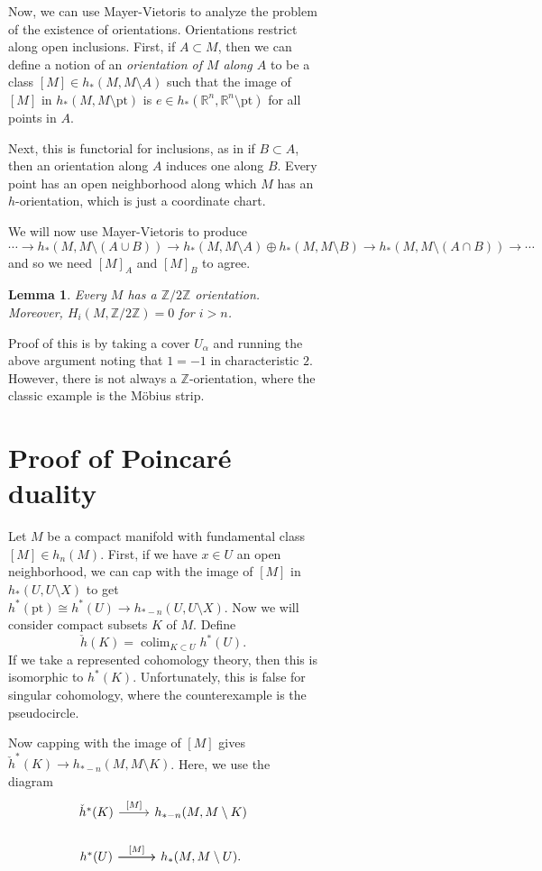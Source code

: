 \documentclass[leqno, openany]{memoir}
\newtheorem{lem}[thm]{Lemma}
\theoremstyle{definition}
\theoremstyle{remark}
\theoremstyle{plain}
\theoremstyle{definition}
\theoremstyle{remark}
\newcommand{\R}{\mathbb{R}}
\newcommand{\Z}{\mathbb{Z}}
\newcommand{\mr}[1]{\mathrm{#1}}
\begin{document}
\begin{figure}[H]
\begin{figure}[H]
Now, we can use Mayer-Vietoris to analyze the problem of the existence of
orientations.  Orientations restrict along open inclusions. First, if $A
\subset M$, then we can define a notion of an \textit{orientation of $M$ along
$A$} to be a class $[M] \in h_*(M, M \setminus A)$ such that the image of $[M]$
in $h_*(M, M \setminus \mr{pt})$ is $e \in h_*(\R^n, \R^n \setminus \mr{pt})$
for all points in $A$.

Next, this is functorial for inclusions, as in if $B \subset A$, then an
orientation along $A$ induces one along $B$. Every point has an open
neighborhood along which $M$ has an $h$-orientation, which is just a coordinate
chart. 

We will now use Mayer-Vietoris to produce \[ \cdots \to h_*(M, M \setminus (A
\cup B)) \to h_*(M, M \setminus A) \oplus h_*(M, M \setminus B) \to h_*(M, M
\setminus (A \cap B)) \to \cdots \] and so we need $[M]_A$ and $[M]_B$ to
agree.

\begin{lem} Every $M$ has a $\Z/2\Z$ orientation. Moreover, $H_i(M, \Z/2\Z) =
0$ for $i > n$.  \end{lem}

Proof of this is by taking a cover $U_{\alpha}$ and running the above argument
noting that $1 = -1$ in characteristic $2$. However, there is not always a
$\Z$-orientation, where the classic example is the M\"obius strip.

\section{Proof of Poincar\'e duality}%

Let $M$ be a compact manifold with fundamental class $[M] \in h_n(M)$. First,
if we have $x \in U$ an open neighborhood, we can cap with the image of $[M]$
in $h_*(U, U \setminus X)$ to get $h^*(\mr{pt}) \cong h^*(U) \to h_{*-n}(U, U
\setminus X)$. Now we will consider compact subsets $K$ of $M$. Define \[
\check{h}(K) = \operatorname{colim}_{K \subset U} h^*(U). \] If we take a
represented cohomology theory, then this is isomorphic to $h^*(K)$.
Unfortunately, this is false for singular cohomology, where the counterexample
is the pseudocircle.

Now capping with the image of $[M]$ gives $\check{h}^*(K) \to h_{*-n}(M, M
\setminus K)$. Here, we use the diagram \begin{equation*} \begin{tikzcd}
    \check{h}^*(K) \arrow{r}{{[M]}} & h_{*-n}(M, M \setminus K) \\ h^*(U)
    \arrow{r} \arrow{r}{{[M]}} & h_*(M, M \setminus U).  \end{tikzcd}
\end{equation*}



\end{figure}
\end{figure}
\end{document}
